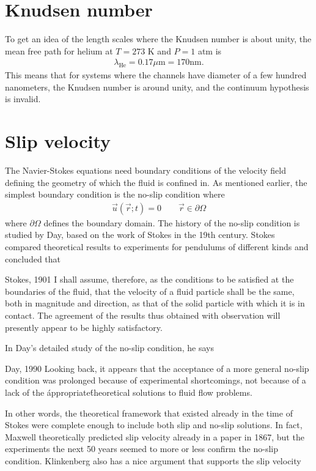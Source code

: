\section{Knudsen number}
\label{sec:knudsen_number}
To get an idea of the length scales where the Knudsen number is about unity, the mean free path for helium at $T=273$ K and $P=1$ atm is\cite{lillestol2001generell} 
\begin{align}
	\label{eq:helium_mfp}
	\lambda_{\text{He}} = 0.17\mu \text{m} = 170 \text{nm}.
\end{align}
This means that for systems where the channels have diameter of a few hundred nanometers, the Knudsen number is around unity, and the continuum hypothesis is invalid. 
\section{Slip velocity}
\label{sec:slip_length}
The Navier-Stokes equations need boundary conditions of the velocity field defining the geometry of which the fluid is confined in. As mentioned earlier, the simplest boundary condition is the no-slip condition where
\begin{align}
	\vec u(\vec r; t) = 0 \qquad \vec r \in \partial\Omega
\end{align}
where $\partial\Omega$ defines the boundary domain. The history of the no-slip condition is studied by Day, based on the work of Stokes in the 19th century. Stokes compared theoretical results to experiments for pendulums of different kinds and concluded that\cite{day1990no}
\begin{aquote}{Stokes, 1901}
	I shall assume, therefore, as the conditions to be satisfied at the boundaries of the fluid, that the velocity of a fluid particle shall be the same, both in magnitude and direction, as that of the solid particle with which it is in contact. The agreement of the results thus obtained with observation will presently appear to be highly satisfactory.
\end{aquote}
In Day's detailed study of the no-slip condition, he says
\begin{aquote}{Day, 1990}
	Looking back, it appears that the acceptance of a more general no-slip condition was prolonged because of experimental shortcomings, not because of a lack of the \'appropriate\' theoretical solutions to fluid flow problems.
\end{aquote}
In other words, the theoretical framework that existed already in the time of Stokes were complete enough to include both slip and no-slip solutions. In fact, Maxwell theoretically predicted slip velocity already in a paper in 1867\cite{maxwell1879stresses}, but the experiments the next 50 years seemed to more or less confirm the no-slip condition.  Klinkenberg also has a nice argument that supports the slip velocity
